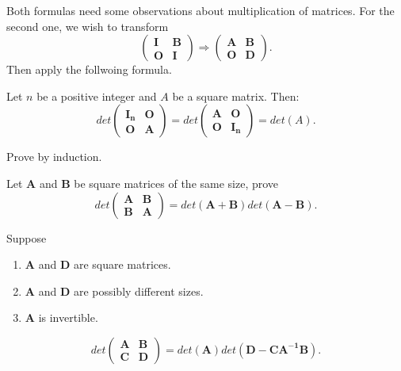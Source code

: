 \documentclass[12pt]{article}
\begin{document}
\begin{pfbox}
    Both formulas need some observations about multiplication of matrices.
    For the second one, we wish to transform 
    \[\begin{pmatrix}
\mathbf{I} & \mathbf{B}\\
\mathbf{O} & \mathbf{I}
\end{pmatrix}\Rightarrow\begin{pmatrix}
\mathbf{A} & \mathbf{B}\\
\mathbf{O} & \mathbf{D}
\end{pmatrix}.\]
Then apply the follwoing formula.
\end{pfbox}

\begin{theorem}
    Let $n$ be a positive integer and $A$ be a square matrix. Then:
    \[det\begin{pmatrix}
\mathbf{I_n} & \mathbf{O}\\
\mathbf{O} & \mathbf{A}
\end{pmatrix}=det\begin{pmatrix}
\mathbf{A} & \mathbf{O}\\
\mathbf{O} & \mathbf{I_n}
\end{pmatrix}=det(A).\]
\end{theorem}

\begin{pfbox}
    Prove by induction.
\end{pfbox}

\begin{exercise}
Let $\textbf{A}$ and $\textbf{B}$ be square matrices of the same size, prove 
\[det\begin{pmatrix}
\mathbf{A} & \mathbf{B}\\
\mathbf{B} & \mathbf{A}
\end{pmatrix} = det(\mathbf{A}+\mathbf{B})det(\mathbf{A}-\mathbf{B}).\]
\end{exercise}


\begin{theorem}
    Suppose
    \begin{enumerate}
       \item $\textbf{A}$ and $\textbf{D}$ are square matrices.
       \item $\textbf{A}$ and $\textbf{D}$ are possibly different sizes.
       \item $\textbf{A}$ is invertible. 
    \end{enumerate}
    \[det\begin{pmatrix}
\mathbf{A} & \mathbf{B}\\
\mathbf{C} & \mathbf{D}
\end{pmatrix} = det(\mathbf{A})det(\mathbf{D}-\mathbf{CA^{-1}B}).\]
\end{theorem}
\end{document}
